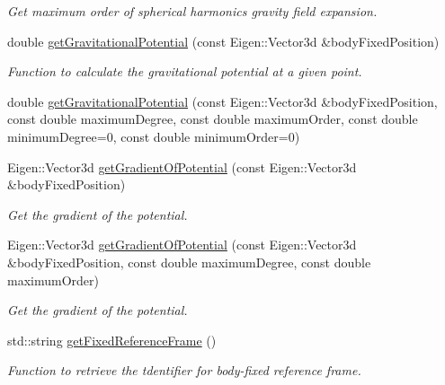 \begin{DoxyCompactItemize}
\begin{DoxyCompactList}\small\item\em Get maximum order of spherical harmonics gravity field expansion. \end{DoxyCompactList}\item 
double \hyperlink{classtudat_1_1gravitation_1_1SphericalHarmonicsGravityField_a2c36df54fbe2c2160761e90e882f7a61}{get\+Gravitational\+Potential} (const Eigen\+::\+Vector3d \&body\+Fixed\+Position)
\begin{DoxyCompactList}\small\item\em Function to calculate the gravitational potential at a given point. \end{DoxyCompactList}\item 
double \hyperlink{classtudat_1_1gravitation_1_1SphericalHarmonicsGravityField_ac8ce49184aee17c15460841d6b30890e}{get\+Gravitational\+Potential} (const Eigen\+::\+Vector3d \&body\+Fixed\+Position, const double maximum\+Degree, const double maximum\+Order, const double minimum\+Degree=0, const double minimum\+Order=0)
\item 
Eigen\+::\+Vector3d \hyperlink{classtudat_1_1gravitation_1_1SphericalHarmonicsGravityField_a7e24f9dd380f6d26572f263f79809bdd}{get\+Gradient\+Of\+Potential} (const Eigen\+::\+Vector3d \&body\+Fixed\+Position)
\begin{DoxyCompactList}\small\item\em Get the gradient of the potential. \end{DoxyCompactList}\item 
Eigen\+::\+Vector3d \hyperlink{classtudat_1_1gravitation_1_1SphericalHarmonicsGravityField_a11f957ce082b81c5f44b3665de6f83b6}{get\+Gradient\+Of\+Potential} (const Eigen\+::\+Vector3d \&body\+Fixed\+Position, const double maximum\+Degree, const double maximum\+Order)
\begin{DoxyCompactList}\small\item\em Get the gradient of the potential. \end{DoxyCompactList}\item 
std\+::string \hyperlink{classtudat_1_1gravitation_1_1SphericalHarmonicsGravityField_ab9a883874e78a54c197f63614cd910d6}{get\+Fixed\+Reference\+Frame} ()
\begin{DoxyCompactList}\small\item\em Function to retrieve the tdentifier for body-\/fixed reference frame. \end{DoxyCompactList}\end{DoxyCompactItemize}
